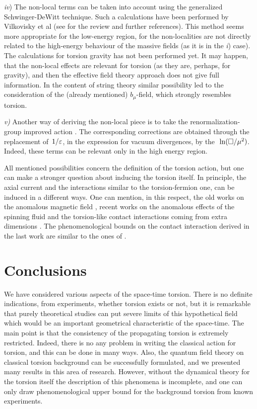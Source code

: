 {\it iv}) The non-local terms can be taken into account  
using the generalized 
Schwinger-DeWitt technique. Such a calculations have 
been performed by Vilkovisky et al (see \cite{vilk} for 
the review and further references). This method seems more 
appropriate for the low-energy region, for the non-localities
are not directly related to the high-energy behaviour of the 
massive fields (as it is in the {\it i}) case). The calculations
for torsion gravity has not been performed yet. It may 
happen, that the non-local effects are relevant for torsion
(as they are, perhaps, for gravity), and then the effective 
field theory approach does not give full information. In the
content of string theory similar possibility led to the 
consideration of the (already mentioned) $b_\mu$-field, 
which strongly resembles torsion. 

{\it v)} Another way of deriving the non-local piece is to 
take the renormalization-group improved action \cite{maroto-thes}.
The corresponding corrections are obtained through the 
replacement of $\,1/\varepsilon$, in the expression for vacuum 
divergences, by the $\,\,{\rm ln} ({\Box}/\mu^2)$. 
Indeed, these terms can be relevant only in the high 
energy region.

All mentioned possibilities concern the definition of the
torsion action, but one can make a stronger question about 
inducing the torsion itself. In principle, the axial current 
and the interactions similar to the torsion-fermion one,
can be induced in a different ways. One can mention, in this
respect, the old works on the anomalous magnetic field
\cite{Nikitin}, recent works on the anomalous effects of 
the spinning fluid \cite{volovik} and the torsion-like 
contact interactions coming from extra dimensions 
\cite{extra-dim}. The phenomenological bounds on the 
contact interaction derived in the last work are similar 
to the ones of \cite{betor}. 

\vskip 10mm
\chapter{Conclusions} 

We have considered various aspects of the space-time torsion. 
There is no definite indications, 
from experiments, whether torsion exists or not, but it is
remarkable that purely theoretical studies can put
severe limits of this hypothetical field which would be an 
important geometrical characteristic of the space-time.   
The main point is that the consistency of the propagating torsion 
is extremely restricted. Indeed, there 
is no any problem in writing the classical action for torsion,
and this can be done in many ways. Also, the quantum
field theory on classical torsion background can be successfully 
formulated, and we presented many results in this area of research. 
However, without the dynamical theory for the torsion itself the 
description of this phenomena is incomplete, and one can only 
draw phenomenological upper bound for the background torsion
from known experiments.
 
